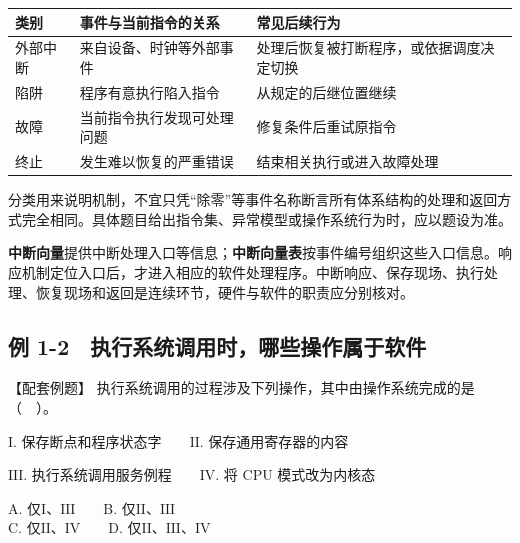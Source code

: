 \par\medskip\noindent\begin{minipage}{\linewidth}\fontsize{9.3}{12}\selectfont\begin{tabularx}{\linewidth}{@{}YYY@{}}
\toprule\noalign{}
\begin{minipage}[b]{\linewidth}\raggedright
类别
\end{minipage} & \begin{minipage}[b]{\linewidth}\raggedright
事件与当前指令的关系
\end{minipage} & \begin{minipage}[b]{\linewidth}\raggedright
常见后续行为
\end{minipage} \\
\midrule\noalign{}


外部中断 & 来自设备、时钟等外部事件 & 处理后恢复被打断程序，或依据调度决定切换 \\
陷阱 & 程序有意执行陷入指令 & 从规定的后继位置继续 \\
故障 & 当前指令执行发现可处理问题 & 修复条件后重试原指令 \\
终止 & 发生难以恢复的严重错误 & 结束相关执行或进入故障处理 \\
\bottomrule\end{tabularx}
\end{minipage}\par\medskip

分类用来说明机制，不宜只凭``除零''等事件名称断言所有体系结构的处理和返回方式完全相同。具体题目给出指令集、异常模型或操作系统行为时，应以题设为准。

\textbf{中断向量}提供中断处理入口等信息；\textbf{中断向量表}按事件编号组织这些入口信息。响应机制定位入口后，才进入相应的软件处理程序。中断响应、保存现场、执行处理、恢复现场和返回是连续环节，硬件与软件的职责应分别核对。

\subsection{例 1-2　执行系统调用时，哪些操作属于软件}\label{OS01-ex1-2}

{\begin{example}[配套例题]

【配套例题】 执行系统调用的过程涉及下列操作，其中由操作系统完成的是（　）。

\ensuremath{\mathrm{I}}. 保存断点和程序状态字　　\ensuremath{\mathrm{II}}. 保存通用寄存器的内容

\ensuremath{\mathrm{III}}. 执行系统调用服务例程　　\ensuremath{\mathrm{IV}}. 将 CPU 模式改为内核态

A. 仅\ensuremath{\mathrm{I}}、\ensuremath{\mathrm{III}}　　B. 仅\ensuremath{\mathrm{II}}、\ensuremath{\mathrm{III}}\\
C. 仅\ensuremath{\mathrm{II}}、\ensuremath{\mathrm{IV}}　　D. 仅\ensuremath{\mathrm{II}}、\ensuremath{\mathrm{III}}、\ensuremath{\mathrm{IV}}

\end{example}}

